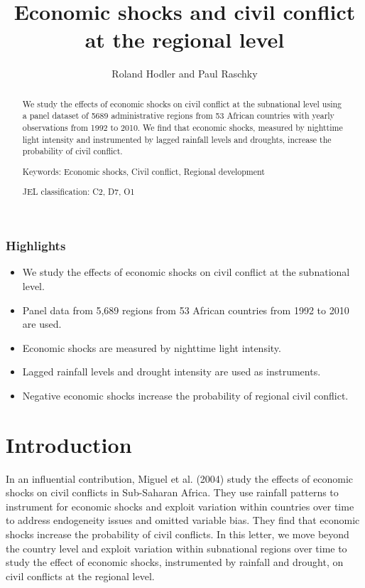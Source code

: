 \documentclass[10pt]{article}
\title{Economic shocks and civil conflict at the regional level}
\author{Roland Hodler and Paul Raschky}
\date{}
\begin{document}
\maketitle

\vspace{1cm}

\begin{abstract}

We study the effects of economic shocks on civil conflict at the subnational level using a panel dataset of 5689 administrative regions from 53 African countries with yearly observations from 1992 to 2010.
We find that economic shocks, measured by nighttime light intensity and instrumented by lagged rainfall levels and droughts, increase the probability of civil conflict.

\vspace{0.5cm}

\noindent Keywords: Economic shocks, Civil conflict, Regional development

\noindent JEL classification: C2, D7, O1    

\end{abstract}


\vspace{4cm}


\subsubsection*{Highlights}

\begin{itemize}
  \item We study the effects of economic shocks on civil conflict at the subnational level.

  \item Panel data from 5,689 regions from 53 African countries from 1992 to 2010 are used.

  \item Economic shocks are measured by nighttime light intensity.

  \item Lagged rainfall levels and drought intensity are used as instruments.

  \item Negative economic shocks increase the probability of regional civil conflict.

\end{itemize}

\newpage

\section{Introduction}
In an influential contribution, Miguel et al. (2004) study the effects of economic shocks on civil conflicts in Sub-Saharan Africa. 
They use rainfall patterns to instrument for economic shocks and exploit variation within countries over time to address endogeneity issues and omitted variable bias. 
They find that economic shocks increase the probability of civil conflicts. 
In this letter, we move beyond the country level and exploit variation within subnational regions over time to study the effect of economic shocks, instrumented by rainfall and drought, on civil conflicts at the regional level.
\end{document}
